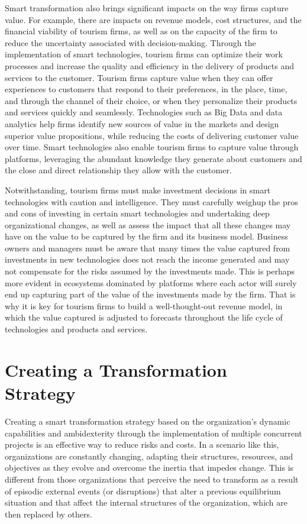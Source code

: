 \documentclass[
  letterpaper,
  DIV=11,
  numbers=noendperiod]{scrreprt}
\begin{document}
Smart transformation also brings significant impacts on the way firms
capture value. For example, there are impacts on revenue models, cost
structures, and the financial viability of tourism firms, as well as on
the capacity of the firm to reduce the uncertainty associated with
decision-making. Through the implementation of smart technologies,
tourism firms can optimize their work processes and increase the quality
and efficiency in the delivery of products and services to the customer.
Tourism firms capture value when they can offer experiences to customers
that respond to their preferences, in the place, time, and through the
channel of their choice, or when they personalize their products and
services quickly and seamlessly. Technologies such as Big Data and data
analytics help firms identify new sources of value in the markets and
design superior value propositions, while reducing the costs of
delivering customer value over time. Smart technologies also enable
tourism firms to capture value through platforms, leveraging the
abundant knowledge they generate about customers and the close and
direct relationship they allow with the customer.

Notwithstanding, tourism firms must make investment decisions in smart
technologies with caution and intelligence. They must carefully weighup
the pros and cons of investing in certain smart technologies and
undertaking deep organizational changes, as well as assess the impact
that all these changes may have on the value to be captured by the firm
and its business model. Business owners and managers must be aware that
many times the value captured from investments in new technologies does
not reach the income generated and may not compensate for the risks
assumed by the investments made. This is perhaps more evident in
ecosystems dominated by platforms where each actor will surely end up
capturing part of the value of the investments made by the firm. That is
why it is key for tourism firms to build a well-thought-out revenue
model, in which the value captured is adjusted to forecasts throughout
the life cycle of technologies and products and services.

\hypertarget{creating-a-transformation-strategy}{%
\section{Creating a Transformation
Strategy}\label{creating-a-transformation-strategy}}

Creating a smart transformation strategy based on the organization's
dynamic capabilities and ambidexterity through the implementation of
multiple concurrent projects is an effective way to reduce risks and
costs. In a scenario like this, organizations are constantly changing,
adapting their structures, resources, and objectives as they evolve and
overcome the inertia that impedes change. This is different from those
organizations that perceive the need to transform as a result of
episodic external events (or disruptions) that alter a previous
equilibrium situation and that affect the internal structures of the
organization, which are then replaced by others.
\end{document}
